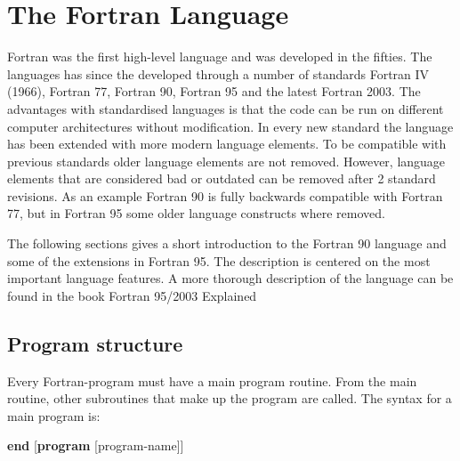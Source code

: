 \chapter{The Fortran Language}

Fortran was the first high-level language and was developed in the fifties. The languages has since the developed through a number of standards Fortran IV (1966), Fortran 77, Fortran 90, Fortran 95 and the latest Fortran 2003. The advantages with standardised languages is that the code can be run on different computer architectures without modification. In every new standard the language has been extended with more modern language elements. To be compatible with previous standards older language elements are not removed. However, language elements that are considered bad or outdated can be removed after 2 standard revisions. As an example Fortran 90 is fully backwards compatible with Fortran 77, but in Fortran 95 some
older language constructs where removed. 

The following sections gives a short introduction to the Fortran 90 language and some of the extensions in Fortran 95. The description is centered on the most important language features. A more thorough description of the language can be found in the book Fortran 95/2003 Explained \cite{metcalf00}

\section{Program structure}

Every Fortran-program must have a main program routine. From the main routine, other subroutines that make up the program are called. The syntax for a main program is:

\begin{fsyntax}
\newline%
\newline%
\newline%
\indent[contains]\newline%
\indent[subroutines]\newline%
\textbf{end} [\textbf{program} [program-name]]\newline
\end{fsyntax}

